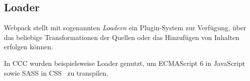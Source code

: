 \subsection{Loader}
\label{sec:gw_loader}

Webpack stellt mit sogenannten \emph{Loadern} ein
Plugin-System zur Verfügung, über das beliebige Transformationen der Quellen
oder das Hinzufügen von Inhalten erfolgen können.

In CCC wurden beispielsweise Loader genutzt, um ECMAScript 6 in
JavaScript~\cite{babelLoader} sowie SASS in CSS~\cite{sassLoader} zu transpilen.
